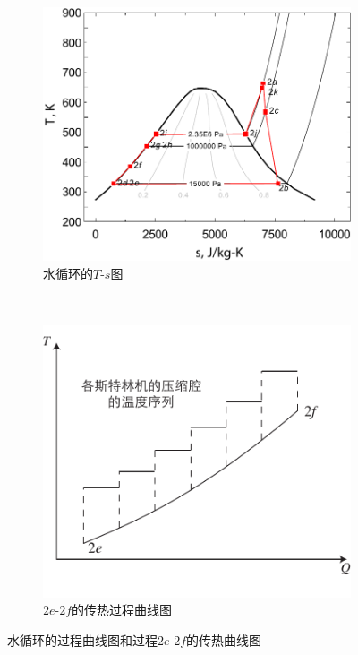 \noindent \begin{figure}[htbp]
\centering
	\begin{subfigure}[b]{0.45\columnwidth}
	\includegraphics[width = \columnwidth]{fig/T-s_Water2}
	\caption{水循环的$T$-$s$图}\label{fig:T-s_Water2}
	\end{subfigure}
	~
\begin{subfigure}[b]{0.45\columnwidth}
	\includegraphics[width = \columnwidth]{fig/HeatTransfer_Water-SEs}
	\caption{$2e$-$2f$的传热过程曲线图}
	\label{fig:HeatTransfer_Water-SEs}
	\end{subfigure}
	
	\caption{水循环的过程曲线图和过程$2e$-$2f$的传热曲线图}\label{fig:Diagrams$2e$-$2f$}
\end{figure}

